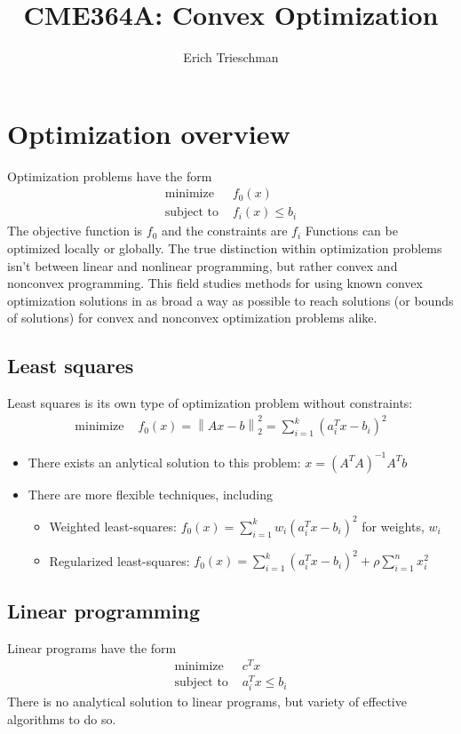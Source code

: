 \documentclass{article}
\title{CME364A: Convex Optimization}
\author{Erich Trieschman}
\newcommand{\norm}[2]{\left\lVert#1\right\rVert_#2}
\begin{document}
\maketitle


\section{Optimization overview}
Optimization problems have the form
\begin{align*}
  \textrm{minimize   } & f_0(x)\\
  \textrm{subject to   } & f_i(x) \leq b_i 
\end{align*}
The objective function is $f_0$ and the constraints are $f_i$
Functions can be optimized locally or globally. The true distinction within optimization problems isn't between linear and nonlinear programming, but rather convex and nonconvex programming. This field studies methods for using known convex optimization solutions in as broad a way as possible to reach solutions (or bounds of solutions) for convex and nonconvex optimization problems alike. 

\subsection{Least squares}
Least squares is its own type of optimization problem without constraints:
\begin{align*}
   \textrm{minimize   } & f_0(x) = \norm{Ax - b}{2}^2 = \sum_{i=1}^k(a_i^Tx - b_i)^2
\end{align*}
\begin{itemize}
  \item There exists an anlytical solution to this problem: $x = (A^TA)^{-1}A^Tb$
  \item There are more flexible techniques, including
  \begin{itemize}
    \item Weighted least-squares: $f_0(x) = \sum_{i=1}^kw_i(a_i^Tx - b_i)^2$ for weights, $w_i$
    \item Regularized least-squares: $f_0(x) = \sum_{i=1}^k(a_i^Tx - b_i)^2 + \rho \sum_{i=1}^nx_i^2$
  \end{itemize}
\end{itemize}

\subsection{Linear programming}
Linear programs have the form
\begin{align*}
  \textrm{minimize   } & c^Tx\\
  \textrm{subject to   } & a_i^Tx \leq b_i 
\end{align*}
There is no analytical solution to linear programs, but variety of effective algorithms to do so.
\end{document}
